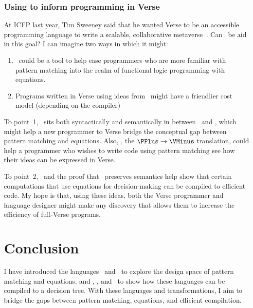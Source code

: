\documentclass[manuscript,screen,review, 12pt, nonacm]{acmart}
\begin{document}
        \subsubsection{Using \VMinus to inform programming in Verse}
        \label{vminusandvc}
        
        At ICFP last year, Tim Sweeney said that he wanted Verse to be an
        accessible programming language to write a scalable, collaborative
        metaverse~\cite{timtalk}. Can \VMinus\ be aid in this goal? I can imagine
        two ways in which it might:
        
        \begin{enumerate}
            \item \VMinus\ could be  a tool to help ease programmers who are
            more familiar with pattern matching into the realm of functional
            logic programming with equations. 
            \item Programs written in Verse using ideas from \VMinus\ might have
            a friendlier cost model (depending on the compiler)
        \end{enumerate}
        
        To point~1, \VMinus\ sits both syntactically and semantically in between
        \PPlus\ and \VC, which might help a new programmer to Verse bridge the
        conceptual gap between pattern matching and equations. Also, \PtoVTran,
        the $\PPlus \rightarrow \VMinus$ translation, could help a programmer 
        who wishes to write code using pattern matching see how their ideas 
        can be expressed in Verse. 

        To point~2, \DTran\ and the proof that \DTran\ preserves semantics help
        show that certain computations that use equations for decision-making
        can be compiled to efficient code. My hope is that, using these ideas,
        both the Verse programmer and language designer might make any discovery
        that allows them to increase the efficiency of full-Verse programs. 

    \section{Conclusion}

    I have introduced the languages \PPlus\ and \VMinus\ to explore the design
    space of pattern matching and equations, and \D, \PtoVTran, and \DTran\ to
    show how these languages can be compiled to a decision tree. With these
    languages and transformations, I aim to bridge the gaps between pattern
    matching, equations, and efficient compilation. 
\end{document}
